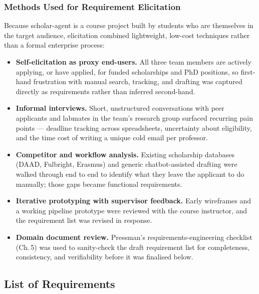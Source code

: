 \documentclass[11pt,a4paper]{article}
\begin{document}
\subsubsection{Methods Used for Requirement Elicitation}
Because scholar-agent is a course project built by students who are themselves in the
target audience, elicitation combined lightweight, low-cost techniques rather than a formal
enterprise process:
\begin{itemize}[leftmargin=14pt,itemsep=3pt]
  \item \textbf{Self-elicitation as proxy end-users.} All three team members are actively
    applying, or have applied, for funded scholarships and PhD positions, so first-hand
    frustration with manual search, tracking, and drafting was captured directly as
    requirements rather than inferred second-hand.
  \item \textbf{Informal interviews.} Short, unstructured conversations with peer applicants
    and labmates in the team's research group surfaced recurring pain points --- deadline
    tracking across spreadsheets, uncertainty about eligibility, and the time cost of writing
    a unique cold email per professor.
  \item \textbf{Competitor and workflow analysis.} Existing scholarship databases (DAAD,
    Fulbright, Erasmus) and generic chatbot-assisted drafting were walked through end to end
    to identify what they leave the applicant to do manually; those gaps became functional
    requirements.
  \item \textbf{Iterative prototyping with supervisor feedback.} Early wireframes and a
    working pipeline prototype were reviewed with the course instructor, and the requirement
    list was revised in response.
  \item \textbf{Domain document review.} Pressman's requirements-engineering checklist
    (Ch.\,5) was used to sanity-check the draft requirement list for completeness,
    consistency, and verifiability before it was finalised below.
\end{itemize}

\subsection{List of Requirements}\label{sec:reqlist}
\end{document}
